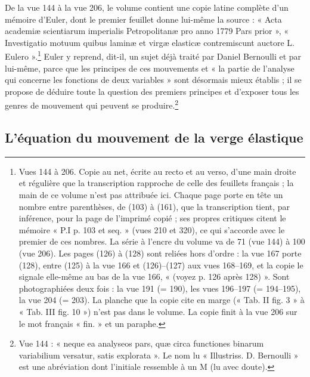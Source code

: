 \documentclass[11pt,a4paper]{article}
\begin{document}
De la vue 144 à la vue 206, le volume contient une copie latine complète d'un mémoire d'Euler, dont le premier feuillet donne lui-même la source : « Acta academiæ scientiarum imperialis Petropolitanæ pro anno 1779 Pars prior », « Investigatio motuum quibus laminæ et virgæ elasticæ contremiscunt auctore L. Eulero ».\footnote{Vues 144 à 206. Copie au net, écrite au recto et au verso, d'une main droite et régulière que la transcription rapproche de celle des feuillets français ; la main de ce volume n'est pas attribuée ici. Chaque page porte en tête un nombre entre parenthèses, de (103) à (161), que la transcription tient, par inférence, pour la page de l'imprimé copié ; ses propres critiques citent le mémoire « P.I p. 103 et seq. » (vues 210 et 320), ce qui s'accorde avec le premier de ces nombres. La série à l'encre du volume va de 71 (vue 144) à 100 (vue 206). Les pages (126) à (128) sont reliées hors d'ordre : la vue 167 porte (128), entre (125) à la vue 166 et (126)--(127) aux vues 168--169, et la copie le signale elle-même au bas de la vue 166, « (voyez p. 126 après 128) ». Sont photographiées deux fois : la vue 191 (= 190), les vues 196--197 (= 194--195), la vue 204 (= 203). La planche que la copie cite en marge (« Tab. II fig. 3 » à « Tab. III fig. 10 ») n'est pas dans le volume. La copie finit à la vue 206 sur le mot français « fin. » et un paraphe.} Euler y reprend, dit-il, un sujet déjà traité par Daniel Bernoulli et par lui-même, parce que les principes de ces mouvements et « la partie de l'analyse qui concerne les fonctions de deux variables » sont désormais mieux établis ; il se propose de déduire toute la question des premiers principes et d'exposer tous les genres de mouvement qui peuvent se produire.\footnote{Vue 144 : « neque ea analyseos pars, quæ circa functiones binarum variabilium versatur, satis explorata ». Le nom lu « Illustriss. D. Bernoulli » est une abréviation dont l'initiale ressemble à un M (lu avec doute).}

\subsection*{L'équation du mouvement de la verge élastique}
\end{document}
